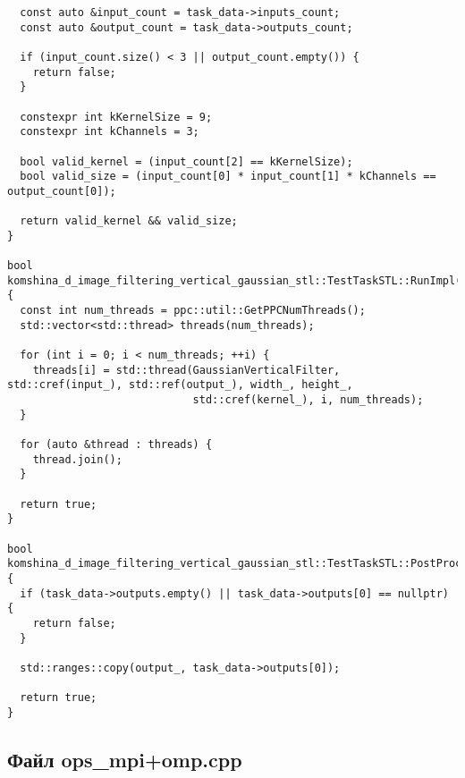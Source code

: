 \documentclass[12pt]{article}
\begin{document}
\begin{lstlisting}
  const auto &input_count = task_data->inputs_count;
  const auto &output_count = task_data->outputs_count;

  if (input_count.size() < 3 || output_count.empty()) {
    return false;
  }

  constexpr int kKernelSize = 9;
  constexpr int kChannels = 3;

  bool valid_kernel = (input_count[2] == kKernelSize);
  bool valid_size = (input_count[0] * input_count[1] * kChannels == output_count[0]);

  return valid_kernel && valid_size;
}

bool komshina_d_image_filtering_vertical_gaussian_stl::TestTaskSTL::RunImpl() {
  const int num_threads = ppc::util::GetPPCNumThreads();
  std::vector<std::thread> threads(num_threads);

  for (int i = 0; i < num_threads; ++i) {
    threads[i] = std::thread(GaussianVerticalFilter, std::cref(input_), std::ref(output_), width_, height_,
                             std::cref(kernel_), i, num_threads);
  }

  for (auto &thread : threads) {
    thread.join();
  }

  return true;
}

bool komshina_d_image_filtering_vertical_gaussian_stl::TestTaskSTL::PostProcessingImpl() {
  if (task_data->outputs.empty() || task_data->outputs[0] == nullptr) {
    return false;
  }

  std::ranges::copy(output_, task_data->outputs[0]);

  return true;
}
\end{lstlisting}

\subsection*{Файл ops\_mpi+omp.cpp}
\end{document}
